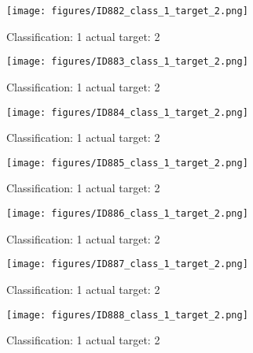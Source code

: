 \begin{figure}[h!]
\begin{center}
\texttt{[image: figures/ID882\_class\_1\_target\_2.png]}
\end{center}
\caption{ Classification: 1 actual target: 2}
\label{fig:ID882_class_1_target_2}
\end{figure}
\begin{figure}[h!]
\begin{center}
\texttt{[image: figures/ID883\_class\_1\_target\_2.png]}
\end{center}
\caption{ Classification: 1 actual target: 2}
\label{fig:ID883_class_1_target_2}
\end{figure}
\begin{figure}[h!]
\begin{center}
\texttt{[image: figures/ID884\_class\_1\_target\_2.png]}
\end{center}
\caption{ Classification: 1 actual target: 2}
\label{fig:ID884_class_1_target_2}
\end{figure}
\begin{figure}[h!]
\begin{center}
\texttt{[image: figures/ID885\_class\_1\_target\_2.png]}
\end{center}
\caption{ Classification: 1 actual target: 2}
\label{fig:ID885_class_1_target_2}
\end{figure}
\begin{figure}[h!]
\begin{center}
\texttt{[image: figures/ID886\_class\_1\_target\_2.png]}
\end{center}
\caption{ Classification: 1 actual target: 2}
\label{fig:ID886_class_1_target_2}
\end{figure}
\begin{figure}[h!]
\begin{center}
\texttt{[image: figures/ID887\_class\_1\_target\_2.png]}
\end{center}
\caption{ Classification: 1 actual target: 2}
\label{fig:ID887_class_1_target_2}
\end{figure}
\begin{figure}[h!]
\begin{center}
\texttt{[image: figures/ID888\_class\_1\_target\_2.png]}
\end{center}
\caption{ Classification: 1 actual target: 2}
\label{fig:ID888_class_1_target_2}
\end{figure}
